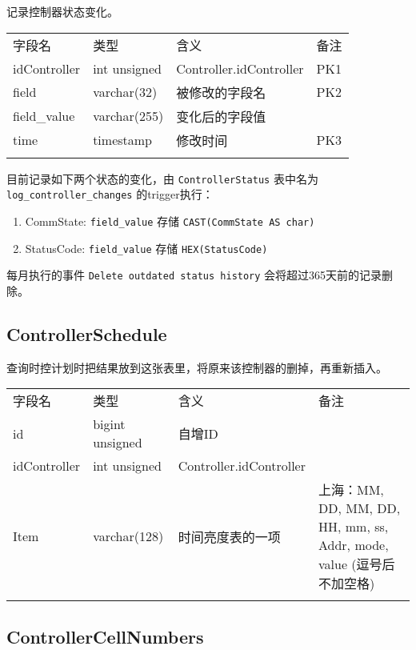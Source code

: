 记录控制器状态变化。

\begin{longtabu}[c]{@{}lXXX@{}}
\toprule\addlinespace
字段名 & 类型 & 含义 & 备注
\\\addlinespace
\midrule\endhead
idController & int unsigned & Controller.idController & PK1
\\\addlinespace
field & varchar(32) & 被修改的字段名 & PK2
\\\addlinespace
field\_value & varchar(255) & 变化后的字段值
\\\addlinespace
time & timestamp & 修改时间 & PK3
\\\addlinespace
\bottomrule
\end{longtabu}

目前记录如下两个状态的变化，由 \texttt{ControllerStatus} 表中名为
\texttt{log\_controller\_changes} 的trigger执行：

\begin{enumerate}
\def\labelenumi{\arabic{enumi}.}
\itemsep1pt\parskip0pt
\item
  CommState: \texttt{field\_value} 存储 \texttt{CAST(CommState AS char)}
\item
  StatusCode: \texttt{field\_value} 存储 \texttt{HEX(StatusCode)}
\end{enumerate}

每月执行的事件 \texttt{Delete outdated status history}
会将超过365天前的记录删除。

\subsection{ControllerSchedule}\label{controllerschedule}

查询时控计划时把结果放到这张表里，将原来该控制器的删掉，再重新插入。

\begin{longtabu}[c]{@{}lXXX@{}}
\toprule\addlinespace
字段名 & 类型 & 含义 & 备注
\\\addlinespace
\midrule\endhead
id & bigint unsigned & 自增ID &
\\\addlinespace
idController & int unsigned & Controller.idController &
\\\addlinespace
Item & varchar(128) & 时间亮度表的一项 & 上海：MM, DD, MM, DD, HH, mm,
ss, Addr, mode, value (逗号后不加空格)
\\\addlinespace
\bottomrule
\end{longtabu}

\subsection{ControllerCellNumbers}\label{controllercellnumbers}

